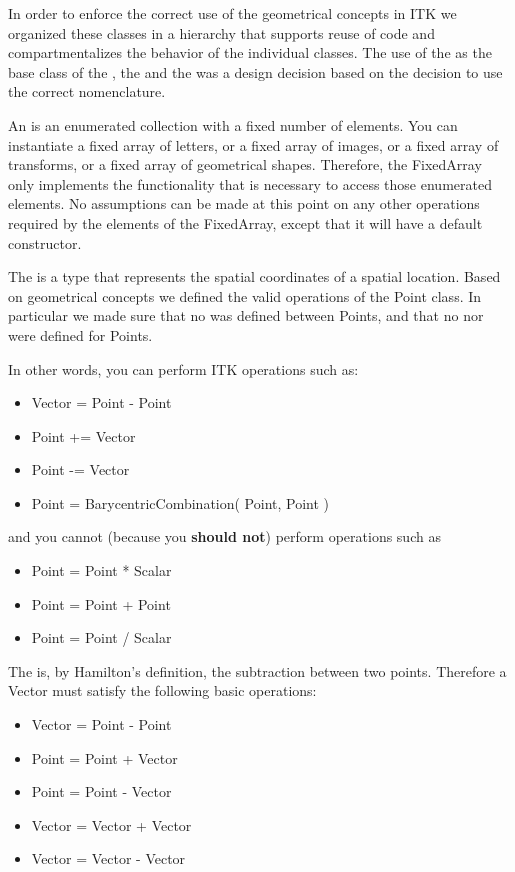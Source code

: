 In order to enforce the correct use of the geometrical concepts in ITK we
organized these classes in a hierarchy that supports reuse of code and
compartmentalizes the behavior of the individual classes.  The use of the
 as the base class of the , the 
and the  was a design decision based on the decision to
use the correct nomenclature.

An  is an enumerated collection with a fixed number of
elements. You can instantiate a fixed array of letters, or a fixed array of
images, or a fixed array of transforms, or a fixed array of geometrical shapes.
Therefore, the FixedArray only implements the functionality that is necessary to
access those enumerated elements. No assumptions can be made at this point on
any other operations required by the elements of the FixedArray, except that it
will have a default constructor.

The  is a type that represents the spatial coordinates of a
spatial location. Based on geometrical concepts we defined the valid operations
of the Point class. In particular we made sure that no  was
defined between Points, and that no  nor
 were defined for Points.

In other words, you can perform ITK operations such as:

\begin{itemize}
\item Vector  = Point - Point
\item Point  +=  Vector
\item Point  -=  Vector
\item Point  = BarycentricCombination( Point, Point )
\end{itemize}

and you cannot (because you \textbf{should not}) perform operations such as

\begin{itemize}
\item Point = Point * Scalar
\item Point = Point + Point
\item Point = Point / Scalar
\end{itemize}

The  is, by Hamilton's definition, the subtraction between two
points. Therefore a Vector must satisfy the following basic operations:

\begin{itemize}
\item Vector = Point - Point
\item Point  = Point + Vector
\item Point  = Point - Vector
\item Vector = Vector + Vector
\item Vector = Vector - Vector
\end{itemize}


